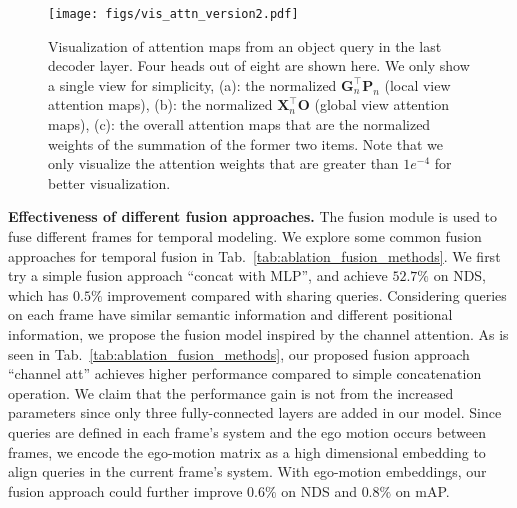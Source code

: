 \documentclass[10pt,twocolumn,letterpaper]{article}
\begin{document}
\begin{figure*}[t]
\centering
\texttt{[image: figs/vis\_attn\_version2.pdf]}
\vspace{-10pt}
\caption{Visualization of attention maps from an object query in the last decoder layer. Four heads out of eight are shown here. We only show a single view for simplicity, (a): the normalized $\mathbf{G}_{n}^\top\mathbf{P}_{n}$ (local view attention maps), (b): the normalized $\mathbf{X}_n^\top\mathbf{O}$ (global view attention maps), (c): the overall attention maps that are the normalized weights of the summation of the former two items.
Note that we only visualize the attention weights that are greater than $1e^{-4}$ for better visualization.
}
\centering
\label{fig:vis_attn}
\vspace{-10pt}
\end{figure*}

\vspace{2mm}
\noindent\textbf{Effectiveness of different fusion approaches.}
The fusion module is used to fuse different frames for temporal modeling. We explore some common fusion approaches for temporal fusion in Tab.~\ref{tab:ablation_fusion_methods}. We first try a simple fusion approach ``concat with MLP'', and achieve $52.7\%$ on NDS, which has $0.5\%$ improvement compared with sharing queries. Considering queries on each frame have similar semantic information and different positional information, we propose the fusion model inspired by the channel attention. As is seen in Tab.~\ref{tab:ablation_fusion_methods}, our proposed fusion approach ``channel att'' achieves higher performance compared to simple concatenation operation. 
We claim that the performance gain is not from the increased parameters since only three fully-connected layers are added in our model.
Since queries are defined in each frame's system and the ego motion occurs between frames, we encode the ego-motion matrix as a high dimensional embedding to align queries in the current frame's system. With ego-motion embeddings, our fusion approach could further improve $0.6\%$ on NDS and $0.8\%$ on mAP.  
\end{document}
